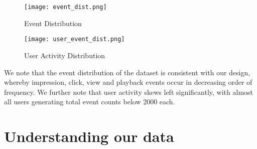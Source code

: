 \documentclass[10pt,titlepage]{article}
\begin{document}
\pagebreak

\begin{center}
\begin{figure}[H]
    \centering
    \texttt{[image: event\_dist.png]}
    \caption{Event Distribution}
    \label{fig:event_dist}

    \hspace*{-2cm}\texttt{[image: user\_event\_dist.png]}
    \caption{User Activity Distribution}
    \label{fig:user_event_dist}
\end{figure}
\end{center}

We note that the event distribution of the dataset is consistent with our design, whereby impression, click, view and
playback events occur in decreasing order of frequency. We further note that user activity skews left significantly,
with almost all users generating total event counts below 2000 each.


\section{Understanding our data}
\end{document}
